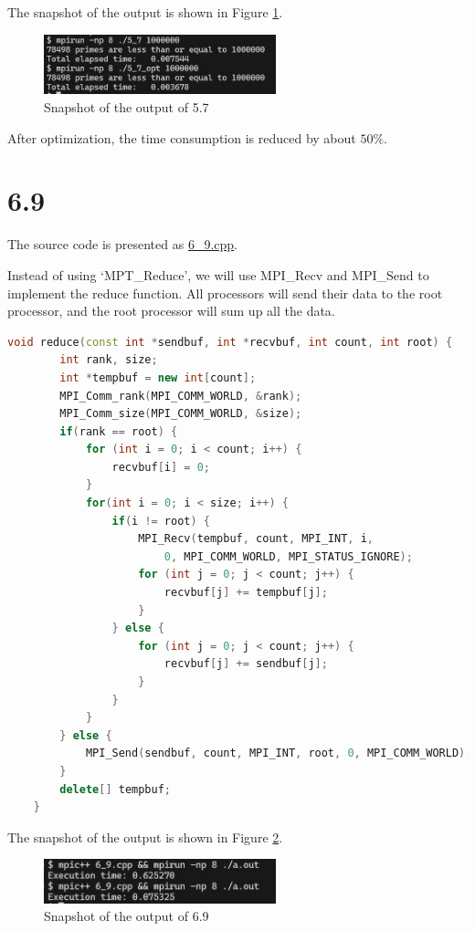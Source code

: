 The snapshot of the output is shown in Figure \ref{fig:5_7}.

\begin{figure}[H]
    \centering
    \includegraphics[width=0.6\textwidth]{fig-5.7.jpg}
    \caption{Snapshot of the output of 5.7}
    \label{fig:5_7}
\end{figure}

After optimization, the time consumption is reduced by about $50\%$.

\section*{6.9}

The source code is presented as \href{run:./6_9.cpp}{6\_9.cpp}.

Instead of using `MPT\_Reduce', we will use MPI\_Recv and MPI\_Send to implement the reduce function. All processors will send their data to the root processor, and the root processor will sum up all the data.

\begin{lstlisting}[language=C++]
    void reduce(const int *sendbuf, int *recvbuf, int count, int root) {
        int rank, size;
        int *tempbuf = new int[count];
        MPI_Comm_rank(MPI_COMM_WORLD, &rank);
        MPI_Comm_size(MPI_COMM_WORLD, &size);
        if(rank == root) {
            for (int i = 0; i < count; i++) {
                recvbuf[i] = 0;
            }
            for(int i = 0; i < size; i++) {
                if(i != root) {
                    MPI_Recv(tempbuf, count, MPI_INT, i, 
                        0, MPI_COMM_WORLD, MPI_STATUS_IGNORE);
                    for (int j = 0; j < count; j++) {
                        recvbuf[j] += tempbuf[j];
                    }
                } else {
                    for (int j = 0; j < count; j++) {
                        recvbuf[j] += sendbuf[j];
                    }
                }
            }
        } else {
            MPI_Send(sendbuf, count, MPI_INT, root, 0, MPI_COMM_WORLD);
        }
        delete[] tempbuf;
    }
\end{lstlisting}

The snapshot of the output is shown in Figure \ref{fig:6_9}.

\begin{figure}[H]
    \centering
    \includegraphics[width=0.6\textwidth]{fig-6.9.jpg}
    \caption{Snapshot of the output of 6.9}
    \label{fig:6_9}
\end{figure}

